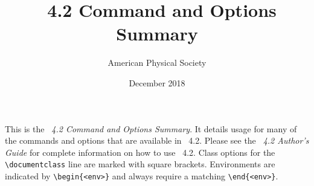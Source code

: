 \documentclass[%
twocolumn,secnumarabic,amssymb, amsmath, nofootinbib,tightenlines,
nobibnotes, aps, 
prl,
]{revtex4-2}
\begin{document}
\title[Command Option Summary]{\revtex~4.2 Command and Options Summary}%

\author{American Physical Society}%
\date{December 2018}%
\maketitle

This is the \textit{\revtex~4.2 Command and Options Summary}. It details
usage for many of the  commands and options that are available in
\revtex~4.2. Please see the \textit{\revtex~4.2 Author's Guide} for
complete information on how to use \revtex~4.2.  Class options for the
\verb+\documentclass+ line are marked with square
brackets. Environments are indicated by \verb+\begin{<env>}+ and always
require a matching \verb+\end{<env>}+.
\end{document}
